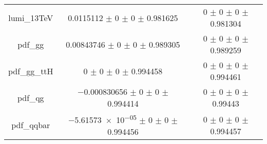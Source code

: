 \begin{table}
\begin{tabular}{ccc}
lumi\_13TeV & \num{0.0115112} $\pm$ \num{0} $\pm$ \num{0} $\pm$ \num{0.981625} & \num{0} $\pm$ \num{0} $\pm$ \num{0} $\pm$ \num{0.981304}\\
pdf\_gg & \num{0.00843746} $\pm$ \num{0} $\pm$ \num{0} $\pm$ \num{0.989305} & \num{0} $\pm$ \num{0} $\pm$ \num{0} $\pm$ \num{0.989259}\\
pdf\_gg\_ttH & \num{0} $\pm$ \num{0} $\pm$ \num{0} $\pm$ \num{0.994458} & \num{0} $\pm$ \num{0} $\pm$ \num{0} $\pm$ \num{0.994461}\\
pdf\_qg & \num{-0.000830656} $\pm$ \num{0} $\pm$ \num{0} $\pm$ \num{0.994414} & \num{0} $\pm$ \num{0} $\pm$ \num{0} $\pm$ \num{0.99443}\\
pdf\_qqbar & \num{-5.61573e-05} $\pm$ \num{0} $\pm$ \num{0} $\pm$ \num{0.994456} & \num{0} $\pm$ \num{0} $\pm$ \num{0} $\pm$ \num{0.994457}\\
\bottomrule
\end{tabular}
\end{table}